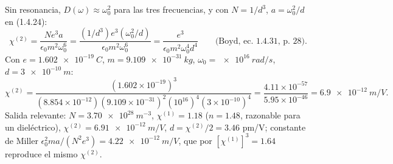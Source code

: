 Sin resonancia, $D(\omega)\approx\omega_0^2$ para las tres frecuencias, y con $N=1/d^3$, $a=\omega_0^2/d$ en (1.4.24):
\[
\chi^{(2)}=\frac{Ne^3a}{\epsilon_0m^2\omega_0^6}=\frac{(1/d^3)e^3(\omega_0^2/d)}{\epsilon_0m^2\omega_0^6}=\frac{e^3}{\epsilon_0m^2\omega_0^4d^4}\qquad\text{(Boyd, ec.~1.4.31, p.~28)}.
\]
Con $e=\SI{1.602e-19}{C}$, $m=\SI{9.109e-31}{kg}$, $\omega_0=\SI{e16}{rad/s}$, $d=\SI{3e-10}{m}$:
\[
\chi^{(2)}=\frac{(1.602\times10^{-19})^3}{(8.854\times10^{-12})(9.109\times10^{-31})^2(10^{16})^4(3\times10^{-10})^4}=\frac{4.11\times10^{-57}}{5.95\times10^{-46}}=\SI{6.9e-12}{m/V}.
\]
Salida relevante: $N=\SI{3.70e28}{m^{-3}}$, $\chi^{(1)}=1.18$ ($n=1.48$, razonable para un dieléctrico), $\chi^{(2)}=\SI{6.91e-12}{m/V}$, $d=\chi^{(2)}/2=3.46$ pm/V; constante de Miller $\epsilon_0^2ma/(N^2e^3)=\SI{4.22e-12}{m/V}$, que por $[\chi^{(1)}]^3=1.64$ reproduce el mismo $\chi^{(2)}$.

